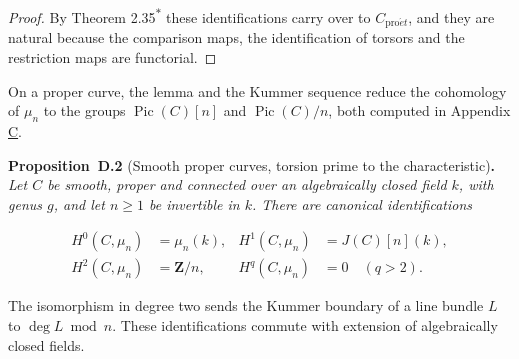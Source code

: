 \documentclass[11pt]{article}
\newenvironment{bpstatement}[2]{\par\addvspace{0.6\baselineskip}\noindent\textbf{#1}#2\textbf{.}\enspace\ignorespaces}
  {\par\addvspace{0.4\baselineskip}}
\newenvironment{bpstatementit}[2]{\begin{bpstatement}{#1}{#2}\itshape\ignorespaces}{\end{bpstatement}}
\newcommand{\bpout}[1]{#1\textsuperscript{\hyperlink{bp-outside}{\ensuremath{\ast}}}}
\begin{document}
\begin{proof}[{Proof}]
By Theorem \bpout{2.35} these identifications carry over to \(C_{\mathrm{pro}\acute{e}t}\), and they are natural because the comparison maps, the identification of torsors and the restriction maps are functorial.
\end{proof}

\label{bp178}%
On a proper curve, the lemma and the Kummer sequence reduce the cohomology of \(\mu_n\) to the groups \(\operatorname{Pic}(C)[n]\) and \(\operatorname{Pic}(C)/n\), both computed in Appendix \hyperref[bp119]{C}.

\label{bp179}%
\begin{bpstatementit}{Proposition~D.2}{ (Smooth proper curves, torsion prime to the characteristic)}
Let \(C\) be smooth, proper and connected over an algebraically closed field \(k\), with genus \(g\), and let \(n\geq1\) be invertible in \(k\). There are canonical identifications

\[
\begin{aligned}
H^0(C,\mu_n)&=\mu_n(k),&
H^1(C,\mu_n)&=J(C)[n](k),\\
H^2(C,\mu_n)&=\mathbf Z/n,&
H^q(C,\mu_n)&=0\quad(q>2).
\end{aligned}
\]

The isomorphism in degree two sends the Kummer boundary of a line bundle \(L\) to \(\deg L\bmod n\).  These identifications commute with extension of algebraically closed fields.
\end{bpstatementit}
\end{document}
